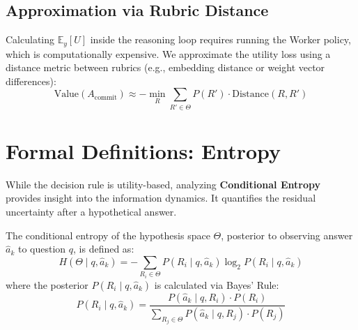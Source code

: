 \documentclass[letterpaper]{article}
\newcommand{\ThetaSet}{\Theta}
\newcommand{\Rubric}{R}
\newcommand{\Question}{q}
\newcommand{\AnswerSim}{\hat{a}}
\newcommand{\Utility}{U}
\begin{document}
\subsection{Approximation via Rubric Distance}
Calculating $\mathbb{E}_{y}[\Utility]$ inside the reasoning loop requires running the Worker policy, which is computationally expensive. We approximate the utility loss using a distance metric between rubrics (e.g., embedding distance or weight vector differences):
\begin{equation}
    \text{Value}(A_{\text{commit}}) \approx - \min_{\Rubric} \sum_{\Rubric' \in \ThetaSet} P(\Rubric') \cdot \text{Distance}(\Rubric, \Rubric')
\end{equation}

\section{Formal Definitions: Entropy}

While the decision rule is utility-based, analyzing \textbf{Conditional Entropy} provides insight into the information dynamics. It quantifies the residual uncertainty after a hypothetical answer.

The conditional entropy of the hypothesis space $\ThetaSet$, posterior to observing answer $\AnswerSim_k$ to question $\Question$, is defined as:
\begin{equation}
    H(\ThetaSet \mid \Question, \AnswerSim_k) = - \sum_{\Rubric_i \in \ThetaSet} P(\Rubric_i \mid \Question, \AnswerSim_k) \log_2 P(\Rubric_i \mid \Question, \AnswerSim_k)
\end{equation}
where the posterior $P(\Rubric_i \mid \Question, \AnswerSim_k)$ is calculated via Bayes' Rule:
\begin{equation}
    P(\Rubric_i \mid \Question, \AnswerSim_k) = \frac{P(\AnswerSim_k \mid \Question, \Rubric_i) \cdot P(\Rubric_i)}{\sum_{\Rubric_j \in \ThetaSet} P(\AnswerSim_k \mid \Question, \Rubric_j) \cdot P(\Rubric_j)}
\end{equation}
\end{document}
